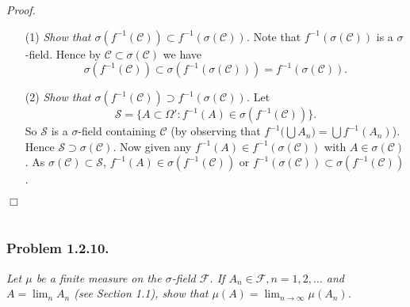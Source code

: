 \documentclass{article}
\begin{document}
\emph{Proof.}
\begin{enumerate}
\item[(1)]
  \emph{Show that $\sigma(f^{-1}(\mathscr{C})) \subset f^{-1}(\sigma(\mathscr{C}))$.}
  Note that $f^{-1}(\sigma(\mathscr{C}))$ is a $\sigma$-field.
  Hence by $\mathscr{C} \subset \sigma(\mathscr{C})$ we have
  \[
   \sigma(f^{-1}(\mathscr{C}))
   \subset \sigma(f^{-1}(\sigma(\mathscr{C})))
   = f^{-1}(\sigma(\mathscr{C})). 
  \]

\item[(2)]
  \emph{Show that $\sigma(f^{-1}(\mathscr{C})) \supset f^{-1}(\sigma(\mathscr{C}))$.}
  Let
  \[
    \mathscr{S} = \{ A \subset \Omega' : f^{-1}(A) \in \sigma(f^{-1}(\mathscr{C})) \}.
  \]
  So $\mathscr{S}$ is a $\sigma$-field containing $\mathscr{C}$
  (by observing that $f^{-1}\big( \bigcup A_n \big) = \bigcup f^{-1}(A_n)$).
  Hence $\mathscr{S} \supset \sigma(\mathscr{C})$.
  Now given any $f^{-1}(A) \in f^{-1}(\sigma(\mathscr{C}))$
  with $A \in \sigma(\mathscr{C})$.
  As $\sigma(\mathscr{C}) \subset \mathscr{S}$,
  $f^{-1}(A) \in \sigma(f^{-1}(\mathscr{C}))$ or
  $f^{-1}(\sigma(\mathscr{C})) \subset \sigma(f^{-1}(\mathscr{C}))$.
\end{enumerate}
$\Box$ \\\\






\subsubsection*{Problem 1.2.10.}
\emph{Let $\mu$ be a finite measure on the $\sigma$-field $\mathscr{F}$.
If $A_n \in \mathscr{F}, n = 1, 2, \ldots$ and $A = \lim_n A_n$ (see Section 1.1),
show that $\mu(A) = \lim_{n \to \infty} \mu(A_n)$.} \\
\end{document}
